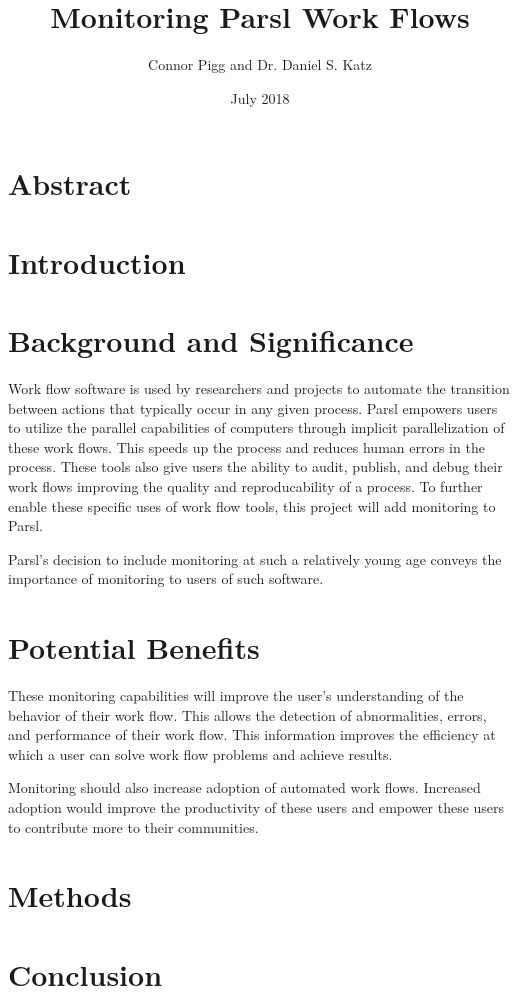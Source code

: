 \documentclass{article}
\title{Monitoring Parsl Work Flows}
\author{Connor Pigg and Dr. Daniel S. Katz}
\date{July 2018}
\begin{document}
\maketitle

\section{Abstract}

\pagebreak

\section{Introduction}


\section{Background and Significance}
Work flow software is used by researchers and projects to automate the transition between actions that typically occur in any given process.
Parsl empowers users to utilize the parallel capabilities of computers through implicit parallelization of these work flows.
This speeds up the process and reduces human errors in the process.
These tools also give users the ability to audit, publish, and debug their work flows improving the quality and reproducability of a process.
To further enable these specific uses of work flow tools, this project will add monitoring to Parsl.

Parsl's decision to include monitoring at such a relatively young age conveys the importance of monitoring to users of such software.

\section{Potential Benefits}
These monitoring capabilities will improve the user's understanding of the behavior of their work flow.
This allows the detection of abnormalities, errors, and performance of their work flow.
This information improves the efficiency at which a user can solve work flow problems and achieve results.

Monitoring should also increase adoption of automated work flows.
Increased adoption would improve the productivity of these users and empower these users to contribute more to their communities.

\section{Methods}


\section{Conclusion}




\end{document}

